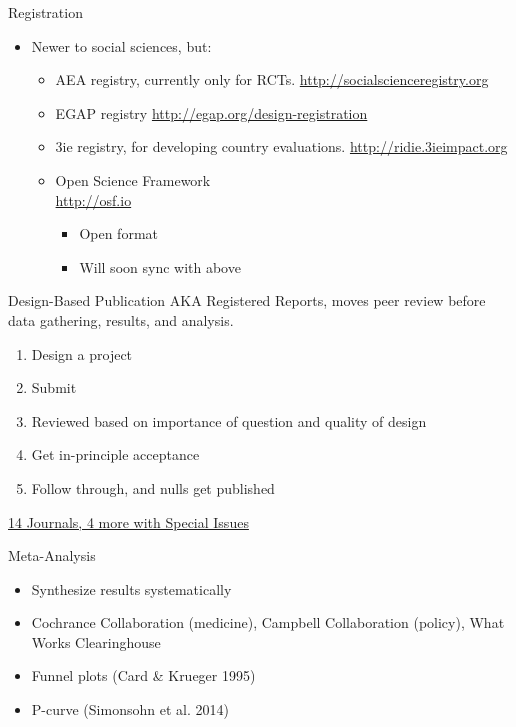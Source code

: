 \documentclass{beamer}
\begin{document}
\begin{frame}{Registration}
\begin{itemize}
   \item Newer to social sciences, but:
   \begin{itemize}[<.->]
   \item
   	AEA registry, currently only for RCTs. \url{http://socialscienceregistry.org}
   \item
    EGAP registry \url{http://egap.org/design-registration}
   \item 
    3ie registry, for developing country evaluations. \url{http://ridie.3ieimpact.org}
   \item
   	Open Science Framework\\ \url{http://osf.io}
   	\begin{itemize}
   	\item
   	Open format
   	\item
   	Will soon sync with above
   	\end{itemize}
   \end{itemize}
  \end{itemize}  
\end{frame}

\begin{frame}{Design-Based Publication}
AKA Registered Reports, moves peer review before data gathering, results, and analysis.

\begin{enumerate}[<.->]
\item Design a project
\item Submit
\item Reviewed based on importance of question and quality of design
\item Get in-principle acceptance
\item Follow through, and nulls get published
\end{enumerate}
\href{https://osf.io/8mpji/wiki/home/}{14 Journals, 4 more with Special Issues }
\end{frame}

\begin{frame}{Meta-Analysis}
\begin{itemize}
\item Synthesize results systematically
\item Cochrance Collaboration (medicine), Campbell Collaboration (policy), What Works Clearinghouse
\item Funnel plots (Card \& Krueger 1995)
\item P-curve (Simonsohn et al. 2014)
\end{itemize}
\end{frame}
\end{document}
